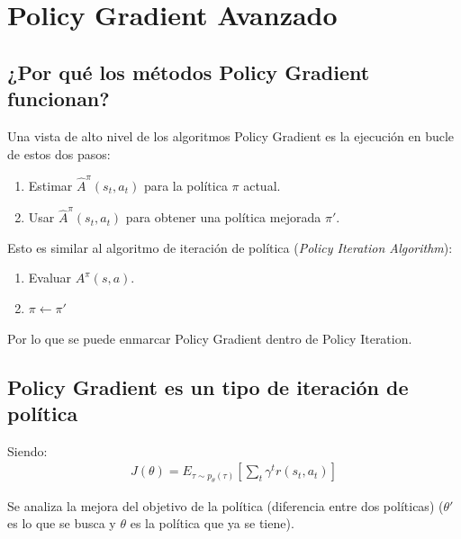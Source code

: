 \chapter{Policy Gradient Avanzado}


\section{¿Por qué los métodos Policy Gradient funcionan?}%
\label{sec:_por_qué_los_métodos_policy_gradient_funcionan_}

Una vista de alto nivel de los algoritmos Policy Gradient es la ejecución en bucle de estos dos
pasos:
\begin{enumerate}
    \item Estimar $\hat{A}^\pi(s_t,a_t)$ para la política $\pi$ actual.
    \item Usar $\hat{A}^\pi(s_t,a_t)$ para obtener una política mejorada $\pi'$.
\end{enumerate}

Esto es similar al algoritmo de iteración de política (\textit{Policy Iteration
Algorithm}):
\begin{enumerate}
    \item Evaluar $A^\pi(s,a)$.
    \item $\pi\gets\pi'$
\end{enumerate}

Por lo que se puede enmarcar Policy Gradient dentro de Policy Iteration.

\section{Policy Gradient es un tipo de iteración de política}%
\label{sec:policy_gradient_es_un_tipo_de_iteración_de_política}

Siendo:
\begin{align}
J ( \theta ) = E _ { \tau \sim p _ { \theta } ( \tau ) } \left[ \sum _ { t } \gamma ^ { t } r ( s
    _ { t } , a _ { t } ) \right]
\end{align}

Se analiza la mejora del objetivo de la política (diferencia entre dos políticas)
($\theta'$ es lo que se busca y $\theta$ es la política que ya se tiene). 

